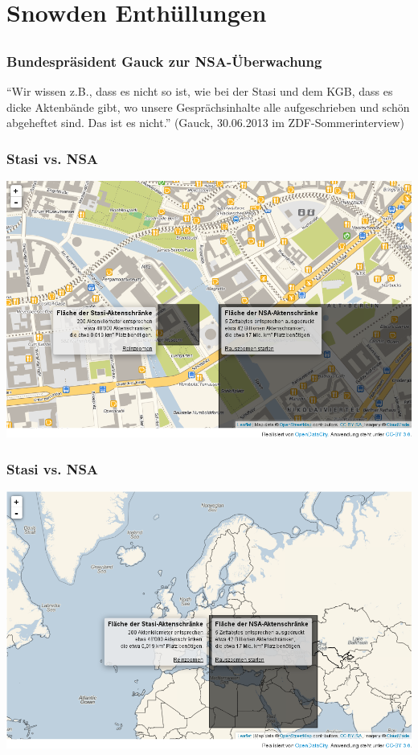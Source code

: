 \documentclass[12pt, xcolor={svgnames,table}]{beamer}
\begin{document}
\section{Snowden Enthüllungen}
\subsection{}

\begin{frame}
    \frametitle{Bundespräsident Gauck zur NSA-Überwachung}
    \begin{center}
      ``Wir wissen z.B., dass es nicht so ist, wie bei der Stasi und dem KGB, dass es dicke Aktenbände gibt, wo unsere Gesprächsinhalte alle aufgeschrieben und schön abgeheftet sind. Das ist es nicht.''
      (Gauck, 30.06.2013 im ZDF-Sommerinterview)
    \end{center}
\end{frame}

\begin{frame}
    \frametitle{Stasi vs. NSA}
    \begin{center}
	\includegraphics[height=0.7\textheight]{img/akten1.png}
    \end{center}
\end{frame}

\begin{frame}
    \frametitle{Stasi vs. NSA}
    \begin{center}
	\includegraphics[height=0.7\textheight]{img/akten2.png}
    \end{center}
\end{frame}
\end{document}
